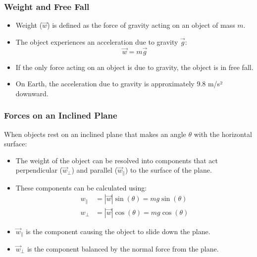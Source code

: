 \documentclass{beamer}
\begin{document}
\begin{frame}
\frametitle{Weight and Free Fall}
\begin{itemize}
    \item Weight ($\vec{w}$) is defined as the force of gravity acting on an object of mass $m$.
    \item The object experiences an acceleration due to gravity $\vec{g}$:
    \[\vec{w}=m\vec{g}\]
    \item If the only force acting on an object is due to gravity, the object is in free fall.
    \item On Earth, the acceleration due to gravity is approximately 9.8 m/s² downward.
\end{itemize}
\end{frame}

\begin{frame}
\frametitle{Forces on an Inclined Plane}
When objects rest on an inclined plane that makes an angle $\theta$ with the horizontal surface:
\begin{itemize}
    \item The weight of the object can be resolved into components that act perpendicular ($\vec{w}_{\perp}$) and parallel ($\vec{w}_{\|}$) to the surface of the plane.
    \item These components can be calculated using:
    \begin{align*}
    w_{\|} &= |\vec{w}| \sin(\theta) = mg \sin(\theta) \\
    w_{\perp} &= |\vec{w}| \cos(\theta) = mg \cos(\theta)
    \end{align*}
    \item $\vec{w}_{\|}$ is the component causing the object to slide down the plane.
    \item $\vec{w}_{\perp}$ is the component balanced by the normal force from the plane.
\end{itemize}
\end{frame}
\end{document}
